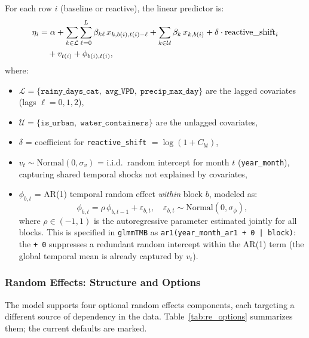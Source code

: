 \documentclass[12pt,a4paper]{article}
\begin{document}
For each row $i$ (baseline or reactive), the linear predictor is:
\begin{align}
\eta_i &= \alpha
  + \sum_{k \in \mathcal{L}} \sum_{\ell=0}^{L} \beta_{k\ell}\, x_{k,b(i),t(i)-\ell}
  + \sum_{k \in \mathcal{U}} \beta_k\, x_{k,b(i)}
  + \delta \cdot \text{reactive\_shift}_i \notag \\
&\quad + v_{t(i)} + \phi_{b(i),t(i)},
\end{align}
where:
\begin{itemize}
\item $\mathcal{L} = \{\texttt{rainy\_days\_cat},\; \texttt{avg\_VPD},\; \texttt{precip\_max\_day}\}$ are the lagged covariates (lags $\ell = 0, 1, 2$),
\item $\mathcal{U} = \{\texttt{is\_urban},\; \texttt{water\_containers}\}$ are the unlagged covariates,
\item $\delta$ = coefficient for \texttt{reactive\_shift} $= \log(1 + C_{bt})$,
\item $v_t \sim \text{Normal}(0, \sigma_v)$ = i.i.d.\ random intercept for month $t$ (\texttt{year\_month}), capturing shared temporal shocks not explained by covariates,
\item $\phi_{b,t}$ = AR(1) temporal random effect \emph{within} block $b$, modeled as:
  \begin{equation}
    \phi_{b,t} = \rho\, \phi_{b,t-1} + \varepsilon_{b,t}, \quad \varepsilon_{b,t} \sim \text{Normal}(0, \sigma_\phi),
  \end{equation}
  where $\rho \in (-1, 1)$ is the autoregressive parameter estimated jointly for all blocks. This is specified in \texttt{glmmTMB} as \texttt{ar1(year\_month\_ar1 + 0 | block)}: the \texttt{+ 0} suppresses a redundant random intercept within the AR(1) term (the global temporal mean is already captured by $v_t$).
\end{itemize}

\subsubsection{Random Effects: Structure and Options}

The model supports four optional random effects components, each targeting a different source of dependency in the data.
Table~\ref{tab:re_options} summarizes them; the current defaults are marked.
\end{document}
